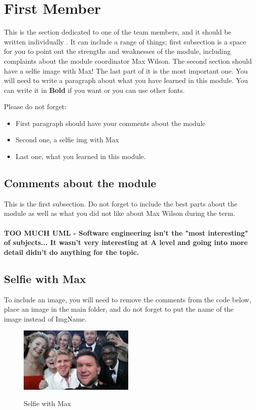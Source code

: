 \section{First Member}
This is the section dedicated to one of the team members, and it should be written individually . It can include a range of things; first subsection is a space for you to point out the strengths and weaknesses of the module, including complaints about the module coordinator Max Wilson. The second section should have a selfie image with Max! The last part of it is the most important one. You will need to write a paragraph about what you have learned in this module. You can write it in \textbf{Bold} if you want or you can use other fonts. 

Please do not forget:
\begin{itemize}
	\item First paragraph should have your comments about the module
	\item Second one, a selfie img with Max
	\item Last one, what you learned in this module.
\end{itemize}

\subsection{Comments about the module}
This is the first subsection. Do not forget to include the best parts about the module as well as what you did not like about Max Wilson during the term.\\\\

\textbf{TOO MUCH UML - Software engineering isn't the "most interesting" of subjects... It wasn't very interesting at A level and going into more detail didn't do anything for the topic.}

\subsection{Selfie with Max}

To include an image, you will need to remove the comments from the code below, place an image in the main folder, and do not forget to put the name of the image instead of ImgName. 

\begin{figure}[h]
\caption{Selfie with Max}
\centering
\includegraphics[width=0.5\textwidth]{Faces.jpg}
\label{fig:selfie}
\end{figure}

